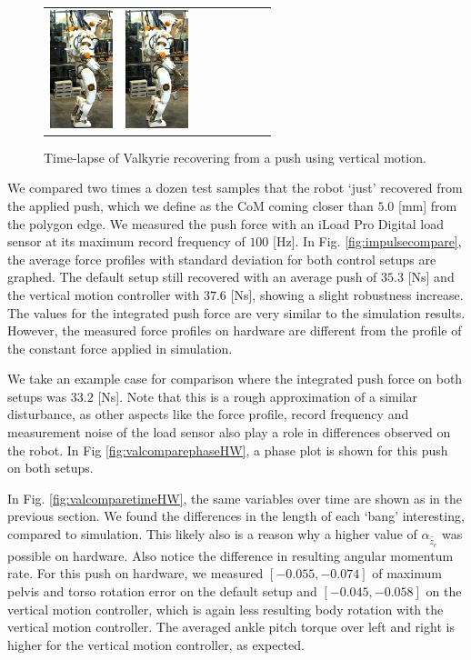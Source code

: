 \documentclass[letterpaper, 10 pt, conference]{ieeeconf}  %
\begin{document}
\begin{figure}[h]
\begin{tabular}{cccccccc}
    \includegraphics[width=0.72in]{val7c} &
    \includegraphics[width=0.72in]{val8c} \\
  \end{tabular}
  \caption{Time-lapse of Valkyrie recovering from a push using vertical motion.}
  \label{fig:val}
\end{figure}

We compared two times a dozen test samples that the robot `just' recovered from the applied push, which we define as the CoM coming closer than $5.0$ [mm] from the polygon edge. We measured the push force with an iLoad Pro Digital load sensor at its maximum record frequency of $100$ [Hz]. In Fig. \ref{fig:impulsecompare}, the average force profiles with standard deviation for both control setups are graphed. The default setup still recovered with an average push of $35.3$ [Ns] and the vertical motion controller with $37.6$ [Ns], showing a slight robustness increase. The values for the integrated push force are very similar to the simulation results. However, the measured force profiles on hardware are different from the profile of the constant force applied in simulation.

We take an example case for comparison where the integrated push force on both setups was $33.2$ [Ns]. Note that this is a rough approximation of a similar disturbance, as other aspects like the force profile, record frequency and measurement noise of the load sensor also play a role in differences observed on the robot. In Fig \ref{fig:valcomparephaseHW}, a phase plot is shown for this push on both setups. 

In Fig. \ref{fig:valcomparetimeHW}, the same variables over time are shown as in the previous section. 
We found the differences in the length of each `bang' interesting, compared to simulation. This likely also is a reason why a higher value of $\alpha_{\hat{\ddot{z}}_{c}}$ was possible on hardware. Also notice the difference in resulting angular momentum rate. For this push on hardware, we measured $[-0.055,-0.074]$ of maximum pelvis and torso rotation error on the default setup and $[-0.045,-0.058]$ on the vertical motion controller, which is again less resulting body rotation with the vertical motion controller. The averaged ankle pitch torque over left and right is higher for the vertical motion controller, as expected.
\end{document}
